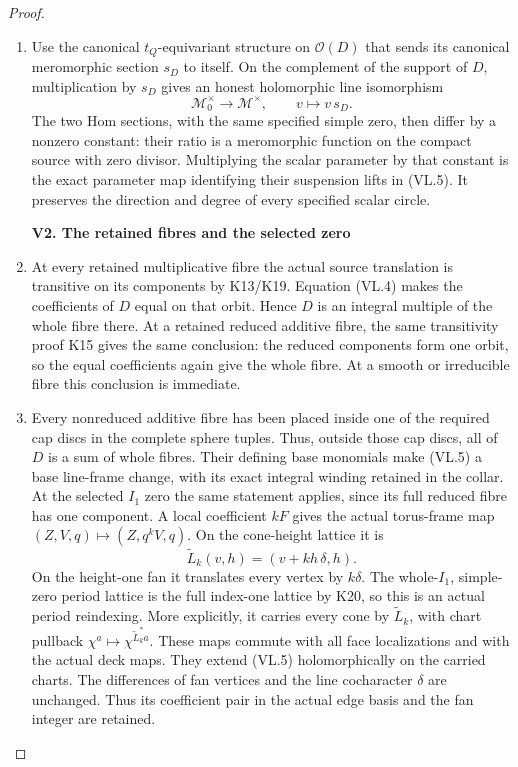 \begin{proof}
\begin{enumerate}[label=\arabic*.]
\item Use the canonical \(t_Q\)-equivariant structure on
\(\mathcal O(D)\) that sends its canonical meromorphic
section \(s_D\) to itself. On the complement of the support
of \(D\), multiplication by \(s_D\) gives an honest
holomorphic line isomorphism
\[
 \mathcal M_0^\times\longrightarrow\mathcal M^\times,
                       \qquad v\longmapsto v\,s_D .
 \tag{VL.5}
\]
The two Hom sections, with the same specified simple zero,
then differ by a nonzero constant: their ratio is a
meromorphic function on the compact source with zero
divisor. Multiplying the scalar parameter by that constant
is the exact parameter map identifying their suspension
lifts in (VL.5). It preserves the direction and degree
of every specified scalar circle.

\par

\medskip\noindent\textbf{V2. The retained fibres and the selected zero}

\par\nobreak

\item At every retained multiplicative fibre the actual source
translation is transitive on its components by K13/K19.
Equation (VL.4) makes the coefficients of \(D\) equal on
that orbit. Hence \(D\) is an integral multiple of the
whole fibre there. At a retained reduced additive fibre,
the same transitivity proof K15 gives the same conclusion:
the reduced components form one orbit, so the equal
coefficients again give the whole fibre. At a smooth or
irreducible fibre this conclusion is immediate.

\item Every nonreduced additive fibre has been placed inside
one of the required cap discs in the complete sphere
tuples. Thus, outside those cap discs, all of \(D\) is a
sum of whole fibres. Their defining base monomials make
(VL.5) a base line-frame change, with its exact integral
winding retained in the collar. At the selected \(I_1\)
zero the same statement applies, since its full reduced
fibre has one component. A local coefficient \(kF\)
gives the actual torus-frame map
\((Z,V,q)\mapsto(Z,q^kV,q)\). On the cone-height lattice
it is
\[
 \widetilde L_k(v,h)=(v+k h\,\delta,h).
 \tag{VL.6}
\]
On the height-one fan it translates every vertex by
\(k\delta\). The whole-\(I_1\), simple-zero period lattice
is the full index-one lattice by K20, so this is an
actual period reindexing. More explicitly, it carries
every cone by \(\widetilde L_k\), with chart pullback
\(\chi^a\mapsto\chi^{\widetilde L_k^*a}\). These maps
commute with all face localizations and with the
actual deck maps. They extend (VL.5) holomorphically
on the carried charts. The differences of fan vertices
and the line cocharacter \(\delta\) are unchanged.
Thus its coefficient pair in the actual edge basis
and the fan integer are retained.


\end{enumerate}
\end{proof}
